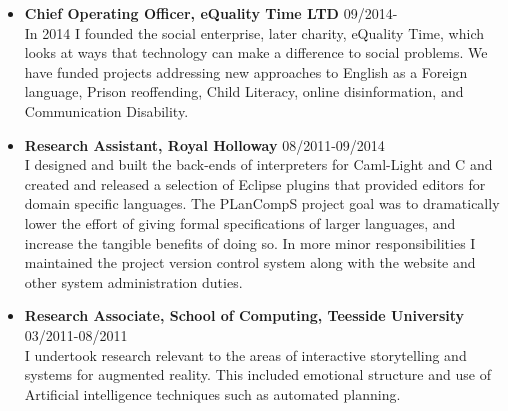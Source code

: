 \documentclass[10pt]{article}
\newenvironment{outerlist}[1][\enskip\textbullet]%
        {\begin{itemize}[#1]}{\end{itemize}%
         \vspace{-.6\baselineskip}}
\begin{document}
\vspace{-0.75cm}
\begin{outerlist}



\item[] {\bf Chief Operating Officer, eQuality Time LTD} \hfill 09/2014- \\
In 2014 I founded the social enterprise, later charity, eQuality Time, which  looks at ways that technology can make a difference to social problems. We have funded projects addressing new approaches to English as a Foreign language, Prison reoffending, Child Literacy, online disinformation, and Communication Disability.  


\item[] {\bf Research Assistant, Royal Holloway} \hfill 08/2011-09/2014 \\
I designed and built the back-ends of interpreters for Caml-Light and C and created and released a selection of Eclipse plugins that provided editors for domain specific languages.  The PLanCompS project goal was to dramatically lower the effort of giving formal specifications of larger languages, and increase the tangible benefits of doing so. In more minor responsibilities I maintained the project version control system along with the website and other system administration duties.  

\item[] {\bf  Research Associate, School of Computing, Teesside University} \hfill 03/2011-08/2011 \\
I undertook research relevant to the areas of interactive storytelling and systems for augmented reality. This included emotional structure and use of Artificial intelligence techniques such as automated planning.


\end{outerlist}
\end{document}
